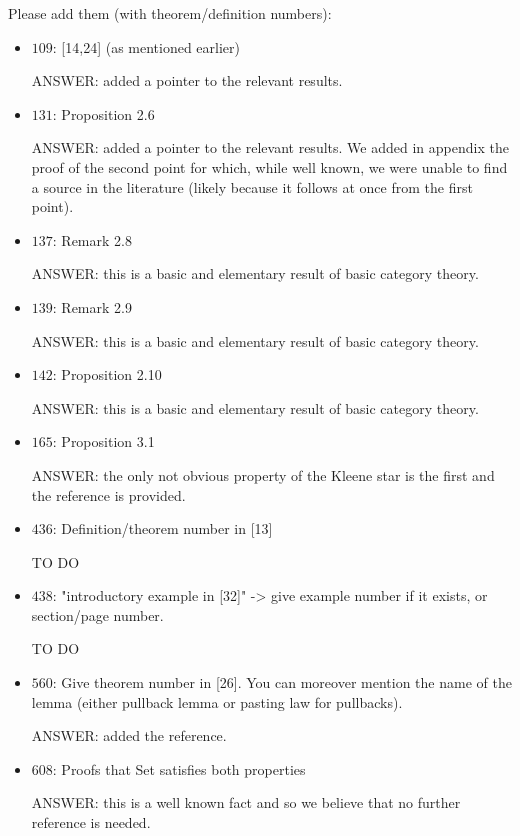 \documentclass[english,11pt,a4paper]{article}
\begin{document}
Please add them (with theorem/definition numbers):
\begin{itemize}
	\item $109$: [14,24] (as mentioned earlier)
	
	ANSWER: added a pointer to the relevant results.
	
	\item $131$: Proposition 2.6

	ANSWER: added a pointer to the relevant results. We added in appendix the proof of the second point for which, while well known, we were unable to find a source in the literature (likely because it follows at once from the first point).


\item $137$: Remark 2.8


ANSWER: this is a basic and elementary result of basic category theory.

\item $139$: Remark 2.9


ANSWER: this is a basic and elementary result of basic category theory.

\item $142$: Proposition 2.10

ANSWER: this is a basic and elementary result of basic category theory.

\item $165$: Proposition 3.1

ANSWER: the only not obvious property of the Kleene star is the first and the reference is provided.
	
	\item $436$: Definition/theorem number in [13]
	
TO DO	
	
	\item  $438$: "introductory example in [32]" -> give example number if it exists, or section/page number.
	
TO DO	


	\item $560$: Give theorem number in [26]. You can moreover mention the name of the lemma (either pullback lemma or pasting law for pullbacks).
	
ANSWER: added the reference. 
	
	\item $608$: Proofs that Set satisfies both properties
	
	ANSWER: this is a well known fact and so we believe that no further reference is needed.
	

\end{itemize}
\end{document}
